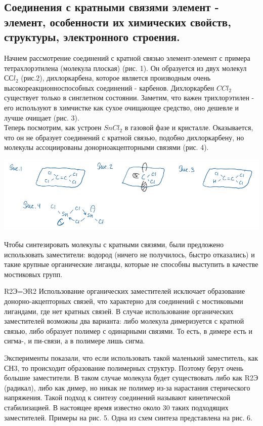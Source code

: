
\subsection{Соединения с кратными связями элемент - элемент, особенности их химических свойств, структуры, электронного строения.}

Начнем рассмотрение соединений с кратной связью элемент-элемент с примера тетрахлорэтилена (молекула плоская) (рис. 1). Он образуется из двух молекул $ССl_2$ (рис.2), дихлоркарбена, которое
является производным очень высокореакционноспособных соединений - карбенов. Дихлоркарбен $CCl_2$ существует только в синглетном состоянии. Заметим, что важен трихлорэтилен - его
используют в химчистке как сухое очищающее средство, оно дешевле и лучше очищает (рис. 3).\\

Теперь посмотрим, как устроен $SnCl_2$ в газовой фазе и кристалле. Оказывается, что он не образует соединений с кратной связью, подобно дихлоркарбену, но молекулы ассоциированы донорноакцепторными связями (рис. 4).

\includegraphics{images/14v1.png}

Чтобы синтезировать молекулы с кратными связями, были предложено использовать заместители: водород (ничего не получилось, быстро отказались) и такие крупные органические лиганды,
которые не способны выступить в качестве мостиковых групп.

R2Э=ЭR2
Использование органических заместителей исключает образование донорно-акцепторных связей, что характерно для соединений с мостиковыми лигандами, где нет кратных связей. В случае
использование органических заместителей возможны два варианта: либо молекула димеризуется с кратной связью, либо образует полимер с одинарными связями. То есть, в димере есть и сигма-,
и пи-связи, а в полимере лишь сигма.

Эксперименты показали, что если использовать такой маленький заместитель, как СН3, то происходит образование полимерных структур. Поэтому берут очень большие заместители. В таком
случае молекула будет существовать либо как R2Э (радикал), либо как димер, но никак не полимер из-за нарастания стерического напряжения. Такой подход к синтезу соединений называют
кинетической стабилизацией. В настоящее время известно около 30 таких подходящих заместителей. Примеры на рис. 5. Одна из схем синтеза представлена на рис. 6. 

